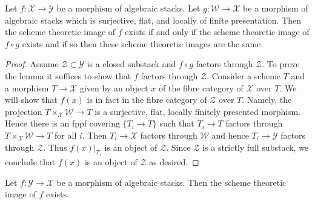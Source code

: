 \begin{lemma}
\label{lemma-cover-upstairs}
Let $f : \mathcal{X} \to \mathcal{Y}$ be a morphism of algebraic stacks.
Let $g : \mathcal{W} \to \mathcal{X}$ be a morphism of algebraic stacks
which is surjective, flat, and locally of finite presentation.
Then the scheme theoretic image of $f$ exists if and only if the
scheme theoretic image of $f \circ g$ exists and if so then these
scheme theoretic images are the same.
\end{lemma}

\begin{proof}
Assume $\mathcal{Z} \subset \mathcal{Y}$
is a closed substack and $f \circ g$ factors through $\mathcal{Z}$.
To prove the lemma it suffices to show
that $f$ factors through $\mathcal{Z}$.
Consider a scheme $T$ and a morphism $T \to \mathcal{X}$
given by an object $x$ of the fibre category of $\mathcal{X}$ over $T$.
We will show that $f(x)$ is in fact in the fibre category of $\mathcal{Z}$
over $T$. Namely, the projection $T \times_\mathcal{X} \mathcal{W} \to T$
is a surjective, flat, locally finitely presented morphism.
Hence there is an fppf covering $\{T_i \to T\}$ such that
$T_i \to T$ factors through $T \times_\mathcal{X} \mathcal{W} \to T$
for all $i$. Then $T_i \to \mathcal{X}$ factors through $\mathcal{W}$
and hence $T_i \to \mathcal{Y}$ factors through $\mathcal{Z}$.
Thus $f(x)|_{T_i}$ is an object of $\mathcal{Z}$.
Since $\mathcal{Z}$ is a strictly full substack, we conclude
that $f(x)$ is an object of $\mathcal{Z}$ as desired.
\end{proof}

\begin{lemma}
\label{lemma-scheme-theoretic-image-existence}
Let $f : \mathcal{Y} \to \mathcal{X}$ be a morphism of algebraic stacks.
Then the scheme theoretic image of $f$ exists.
\end{lemma}

